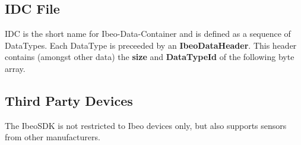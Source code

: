 \subsection{IDC File}
IDC is the short name for Ibeo-Data-Container and is defined as a sequence of DataTypes. Each DataType is preceeded by an \textbf{IbeoDataHeader}. This header contains (amongst other data) the \textbf{size} and \textbf{DataTypeId} of the following byte array. 
 \hfill \break
\newpage

\subsection{Third Party Devices}
The IbeoSDK is not restricted to Ibeo devices only, but also supports sensors from other manufacturers.

